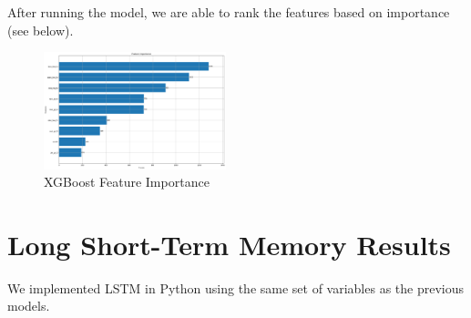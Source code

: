 \documentclass[12pt,oneside]{chicagocapstone}
\begin{document}
After running the model, we are able to rank the features based on importance (see below).
\begin{figure}

{\centering \includegraphics[width=200px,angle = 0, scale=2.1]{figure/FeatureImportance} 

}

\caption{XGBoost Feature Importance}\label{fig:FeatureImportance}
\end{figure}
\hypertarget{long-short-term-memory-results}{%
\section*{Long Short-Term Memory Results}\label{long-short-term-memory-results}}

We implemented LSTM in Python using the same set of variables as the previous models.
\end{document}
